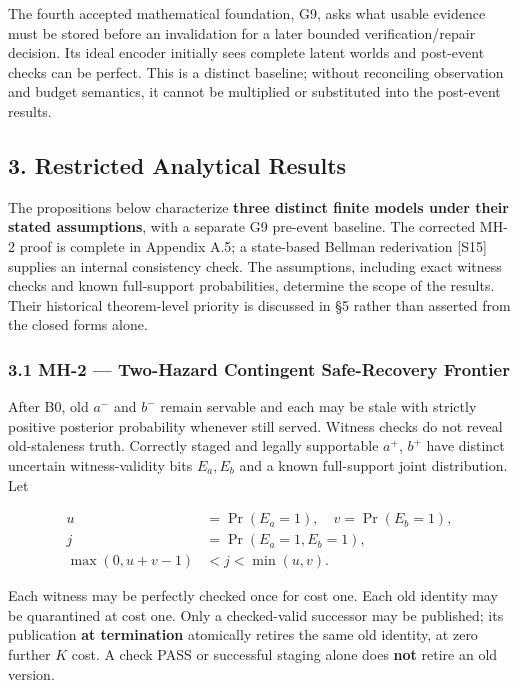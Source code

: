 \documentclass[
  10pt,
  american,
  a4paper,
]{article}
\begin{document}
The fourth accepted mathematical foundation, G9, asks what usable
evidence must be stored before an invalidation for a later bounded
verification/repair decision. Its ideal encoder initially sees complete
latent worlds and post-event checks can be perfect. This is a distinct
baseline; without reconciling observation and budget semantics, it
cannot be multiplied or substituted into the post-event results.

\hypertarget{restricted-analytical-results}{%
\subsection{3. Restricted Analytical
Results}\label{restricted-analytical-results}}

The propositions below characterize \textbf{three distinct finite models
under their stated assumptions}, with a separate G9 pre-event baseline.
The corrected MH-2 proof is complete in Appendix A.5; a state-based
Bellman rederivation {[}S15{]} supplies an internal consistency check.
The assumptions, including exact witness checks and known full-support
probabilities, determine the scope of the results. Their historical
theorem-level priority is discussed in §5 rather than asserted from the
closed forms alone.

\hypertarget{mh-2-two-hazard-contingent-safe-recovery-frontier}{%
\subsubsection{3.1 MH-2 --- Two-Hazard Contingent Safe-Recovery
Frontier}\label{mh-2-two-hazard-contingent-safe-recovery-frontier}}

After B0, old \(a^-\) and \(b^-\) remain servable and each may be stale
with strictly positive posterior probability whenever still served.
Witness checks do not reveal old-staleness truth. Correctly staged and
legally supportable \(a^+\), \(b^+\) have distinct uncertain
witness-validity bits \(E_a,E_b\) and a known full-support joint
distribution. Let

\[
\begin{aligned}
u&=\Pr(E_a=1),\quad v=\Pr(E_b=1),\\
j&=\Pr(E_a=1,E_b=1),\\
\max(0,u+v-1)&<j<\min(u,v).
\end{aligned}
\]

Each witness may be perfectly checked once for cost one. Each old
identity may be quarantined at cost one. Only a checked-valid successor
may be published; its publication \textbf{at termination} atomically
retires the same old identity, at zero further \(K\) cost. A check PASS
or successful staging alone does \textbf{not} retire an old version.
\end{document}
